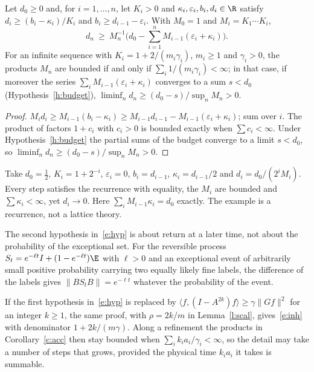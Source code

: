\begin{corollary}[Accumulation]\label{c:acc}
Let $d_0\ge0$ and, for $i=1,\dots,n$, let $K_i>0$ and $\kappa_i,\varepsilon_i,b_i,d_i\in\R$ satisfy
$d_i\ge(b_i-\kappa_i)/K_i$ and $b_i\ge d_{i-1}-\varepsilon_i$. With $M_0=1$ and $M_i=K_1\cdots K_i$,
\[
d_n\ \ge\ M_n^{-1}\Big(d_0-\sum_{i=1}^nM_{i-1}(\varepsilon_i+\kappa_i)\Big).
\]
For an infinite sequence with $K_i=1+2/(m_i\gamma_i)$, $m_i\ge1$ and $\gamma_i>0$, the products $M_n$ are
bounded if and only if $\sum_i1/(m_i\gamma_i)<\infty$; in that case, if moreover the series $\sum_iM_{i-1}(\varepsilon_i+\kappa_i)$ converges to a sum $s<d_0$
(Hypothesis~\ref{h:budget}), $\liminf_nd_n\ge(d_0-s)/\sup_nM_n>0$.
\end{corollary}
\begin{proof}
$M_id_i\ge M_{i-1}(b_i-\kappa_i)\ge M_{i-1}d_{i-1}-M_{i-1}(\varepsilon_i+\kappa_i)$; sum over $i$. The product of
factors $1+c_i$ with $c_i>0$ is bounded exactly when $\sum c_i<\infty$. Under Hypothesis~\ref{h:budget} the
partial sums of the budget converge to a limit $s<d_0$, so $\liminf_nd_n\ge(d_0-s)/\sup_nM_n>0$.
\end{proof}

\begin{remark}\label{r:budget}
Take $d_0=\tfrac12$, $K_i=1+2^{-i}$, $\varepsilon_i=0$, $b_i=d_{i-1}$, $\kappa_i=d_{i-1}/2$ and
$d_i=d_0/(2^iM_i)$. Every step satisfies the recurrence with equality, the $M_i$ are bounded and
$\sum\kappa_i<\infty$, yet $d_i\to0$. Here $\sum_iM_{i-1}\kappa_i=d_0$ exactly. The example is a recurrence,
not a lattice theory.
\end{remark}

\begin{remark}\label{r:reset}
The second hypothesis in~\eqref{e:hyp} is about return at a later time, not about the probability of the
exceptional set. For the reversible process $S_t=e^{-\ell t}I+(1-e^{-\ell t})\E$ with $\ell>0$ and an exceptional event of
arbitrarily small positive probability carrying two equally likely fine labels, the difference of the labels
gives $\|BS_tB\|=e^{-\ell t}$ whatever the probability of the event.
\end{remark}

\begin{remark}\label{r:lag}
If the first hypothesis in~\eqref{e:hyp} is replaced by $\langle f,(I-A^{2k})f\rangle\ge\gamma\|Gf\|^2$ for an
integer $k\ge1$, the same proof, with $\rho=2k/m$ in Lemma~\ref{l:scal}, gives~\eqref{e:inh} with denominator
$1+2k/(m\gamma)$. Along a refinement the products in Corollary~\ref{c:acc} then stay bounded when
$\sum_ik_ia_i/\gamma_i<\infty$, so the detail may take a number of steps that grows, provided the physical
time $k_ia_i$ it takes is summable.
\end{remark}

